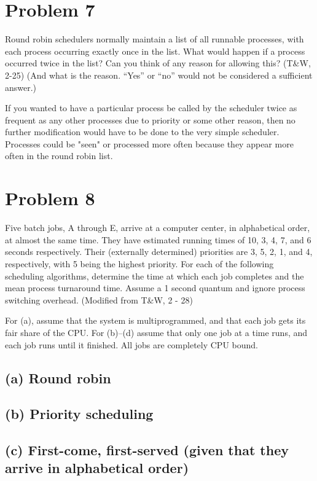 \documentclass[11pt]{article}
\begin{document}
\section*{Problem 7}
Round robin schedulers normally maintain a list of all runnable processes, with each process occurring exactly once in the list. What would happen if a process occurred twice in the list? Can you think of any reason for allowing this? (T\&W, 2-25) (And what is the reason. “Yes” or “no” would not be considered a sufficient answer.)

If you wanted to have a particular process be called by the scheduler twice as frequent as any other processes due to priority or some other reason, then no further modification would have to be done to the very simple scheduler. Processes could be "seen" or processed more often because they appear more often in the round robin list.


\section*{Problem 8}
Five batch jobs, A through E, arrive at a computer center, in alphabetical order, at almost the same time. They have estimated running times of 10, 3, 4, 7, and 6 seconds respectively. Their (externally determined) priorities are 3, 5, 2, 1, and 4, respectively, with 5 being the highest priority. For each of the following scheduling algorithms, determine the time at which each job completes and the mean process turnaround time. Assume a 1 second quantum and ignore process switching overhead. (Modified from T\&W, 2 - 28)

For (a), assume that the system is multiprogrammed, and that each job gets its fair share of the CPU. For (b)–(d) assume that only one job at a time runs, and each job runs until it finished. All jobs are completely CPU bound.

\subsection*{(a) Round robin}


\subsection*{(b) Priority scheduling}


\subsection*{(c) First-come, first-served (given that they arrive in alphabetical order)}
\end{document}
